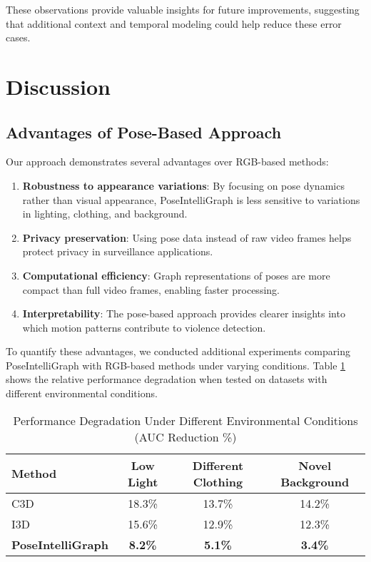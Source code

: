 \documentclass[conference]{IEEEtran}
\begin{document}
These observations provide valuable insights for future improvements, suggesting that additional context and temporal modeling could help reduce these error cases.

\section{Discussion}

\subsection{Advantages of Pose-Based Approach}
Our approach demonstrates several advantages over RGB-based methods:

\begin{enumerate}
    \item \textbf{Robustness to appearance variations}: By focusing on pose dynamics rather than visual appearance, PoseIntelliGraph is less sensitive to variations in lighting, clothing, and background.
    \item \textbf{Privacy preservation}: Using pose data instead of raw video frames helps protect privacy in surveillance applications.
    \item \textbf{Computational efficiency}: Graph representations of poses are more compact than full video frames, enabling faster processing.
    \item \textbf{Interpretability}: The pose-based approach provides clearer insights into which motion patterns contribute to violence detection.
\end{enumerate}

To quantify these advantages, we conducted additional experiments comparing PoseIntelliGraph with RGB-based methods under varying conditions. Table \ref{tab:robustness} shows the relative performance degradation when tested on datasets with different environmental conditions.

\begin{table}[htbp]
\caption{Performance Degradation Under Different Environmental Conditions (AUC Reduction \%)}
\begin{center}
\renewcommand{\arraystretch}{1.2}
\begin{tabular}{|l|c|c|c|}
\hline
\rowcolor[gray]{0.9}
\textbf{Method} & \textbf{Low Light} & \textbf{Different Clothing} & \textbf{Novel Background} \\
\hline
C3D \cite{wu2020not} & 18.3\% & 13.7\% & 14.2\% \\
\hline
I3D \cite{carreira2017quo} & 15.6\% & 12.9\% & 12.3\% \\
\hline
\textbf{PoseIntelliGraph} & \textbf{8.2\%} & \textbf{5.1\%} & \textbf{3.4\%} \\
\hline
\end{tabular}
\end{center}
\label{tab:robustness}
\end{table}
\end{document}
